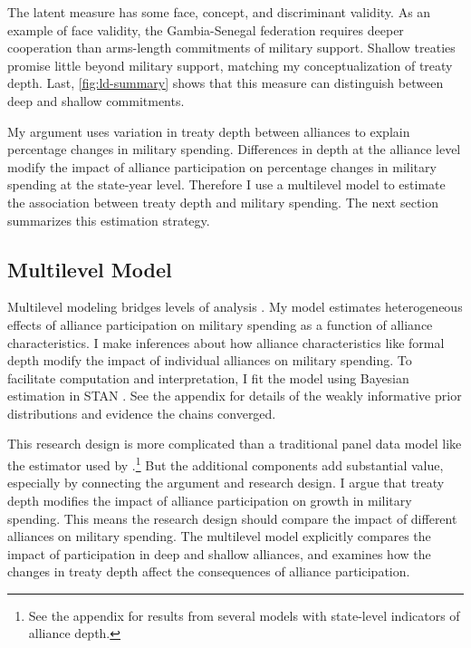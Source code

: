 \documentclass[12pt]{article}
\begin{document}
The latent measure has some face, concept, and discriminant validity. 
As an example of face validity, the Gambia-Senegal federation requires deeper cooperation than arms-length commitments of military support. 
Shallow treaties promise little beyond military support, matching my conceptualization of treaty depth. 
Last, \autoref{fig:ld-summary} shows that this measure can distinguish between deep and shallow commitments. 


My argument uses variation in treaty depth between alliances to explain percentage changes in military spending.
Differences in depth at the alliance level modify the impact of alliance participation on percentage changes in military spending at the state-year level. 
Therefore I use a multilevel model to estimate the association between treaty depth and military spending.  
The next section summarizes this estimation strategy. 


\subsection{Multilevel Model} 


Multilevel modeling bridges levels of analysis \citep{SteenbergenJones2002, GelmanHill2007}. 
My model estimates heterogeneous effects of alliance participation on military spending as a function of alliance characteristics. 
I make inferences about how alliance characteristics like formal depth modify the impact of individual alliances on military spending. 
To facilitate computation and interpretation, I fit the model using Bayesian estimation in STAN \citep{Carpenteretal2016}. 
See the appendix for details of the weakly informative prior distributions and evidence the chains converged.


This research design is more complicated than a traditional panel data model like the estimator used by \citet{DigiuseppePoast2016}.\footnote{See the appendix for results from several models with state-level indicators of alliance depth.}
But the additional components add substantial value, especially by connecting the argument and research design.
I argue that treaty depth modifies the impact of alliance participation on growth in military spending. 
This means the research design should compare the impact of different alliances on military spending. 
The multilevel model explicitly compares the impact of participation in deep and shallow alliances, and examines how the changes in treaty depth affect the consequences of alliance participation. 
\end{document}

